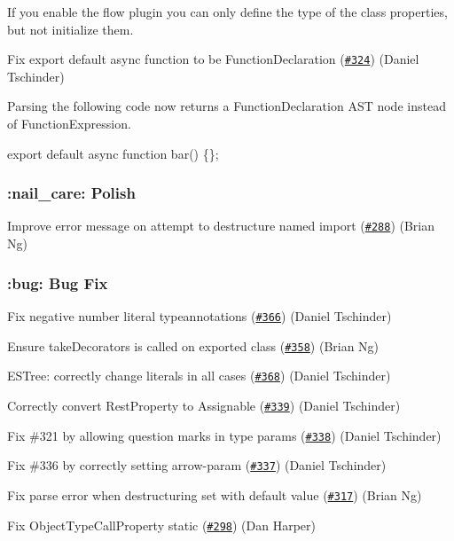 If you enable the flow plugin you can only define the type of the class properties, but not initialize them.

Fix export default async function to be Function\+Declaration (\href{https://github.com/babel/babylon/pull/324}{\tt \#324}) (Daniel Tschinder)

Parsing the following code now returns a {\ttfamily Function\+Declaration} A\+ST node instead of {\ttfamily Function\+Expression}.


\begin{DoxyCode}
export default async function bar() \{\};
\end{DoxyCode}


\subsubsection*{\+:nail\+\_\+care\+: Polish}

Improve error message on attempt to destructure named import (\href{https://github.com/babel/babylon/pull/288}{\tt \#288}) (Brian Ng)

\subsubsection*{\+:bug\+: Bug Fix}

Fix negative number literal typeannotations (\href{https://github.com/babel/babylon/pull/366}{\tt \#366}) (Daniel Tschinder)

Ensure take\+Decorators is called on exported class (\href{https://github.com/babel/babylon/pull/358}{\tt \#358}) (Brian Ng)

E\+S\+Tree\+: correctly change literals in all cases (\href{https://github.com/babel/babylon/pull/368}{\tt \#368}) (Daniel Tschinder)

Correctly convert Rest\+Property to Assignable (\href{https://github.com/babel/babylon/pull/339}{\tt \#339}) (Daniel Tschinder)

Fix \#321 by allowing question marks in type params (\href{https://github.com/babel/babylon/pull/338}{\tt \#338}) (Daniel Tschinder)

Fix \#336 by correctly setting arrow-\/param (\href{https://github.com/babel/babylon/pull/337}{\tt \#337}) (Daniel Tschinder)

Fix parse error when destructuring {\ttfamily set} with default value (\href{https://github.com/babel/babylon/pull/317}{\tt \#317}) (Brian Ng)

Fix Object\+Type\+Call\+Property static (\href{https://github.com/babel/babylon/pull/298}{\tt \#298}) (Dan Harper)

